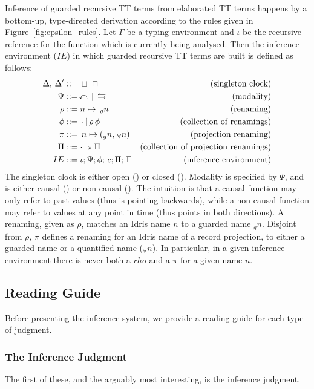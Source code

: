 
Inference of guarded recursive TT terms from elaborated TT terms happens by a
bottom-up, type-directed derivation according to the rules given in
Figure~\ref{fig:epsilon_rules}. Let $\Gamma$ be a typing environment and $\iota$ be the recursive
reference for the function which is currently being analysed. Then the inference
environment ($IE$) in which guarded recursive TT terms are built is defined as follows:
\begin{align*}
   \Delta,\,\Delta^\prime &::=\,\sqcup\,|\,\sqcap & \text{(singleton clock)} \\
   \Psi &::=\,\curvearrowleft\,|\,\leftrightarrows & \text{(modality)} \\
   \rho &::= n \mapsto \,_gn & \text{(renaming)} \\
   \phi &::=\,\cdot\,|\,\rho\,\phi & \text{(collection of renamings)} \\
   \pi &::= \,n \mapsto (_gn,\, _{\forall}n) & \text{(projection renaming)} \\
   \Pi &::= \cdot\,|\,\pi \,\Pi & \text{(collection of projection renamings)} \\
   IE &::= \iota;\Psi;\phi;\,c;\Pi;\,\Gamma & \text{(inference environment)}
\end{align*}
The singleton clock is either open (\open) or closed (\closed). Modality is
specified by $\Psi$, and is either causal (\causal) or non-causal
(\noncausal). The intuition is that a causal function may only refer to past
values (thus \causal{} is pointing backwards), while a non-causal function may
refer to values at any point in time (thus \noncausal{} points in both
directions). A renaming, given as $\rho$, matches an Idris name $n$ to a guarded
name $_gn$. Disjoint from $\rho$, $\pi$ defines a renaming for an Idris name of
a record projection, to either a guarded name or a quantified name
($_{\forall}n$). In particular, in a given inference environment there is never
both a $rho$ and a $\pi$ for a given name $n$.

\subsection{Reading Guide}
Before presenting the inference system, we provide a reading guide for each type
of judgment. 

\subsubsection{The Inference Judgment}
The first of these, and the arguably most interesting, is the inference judgment.

